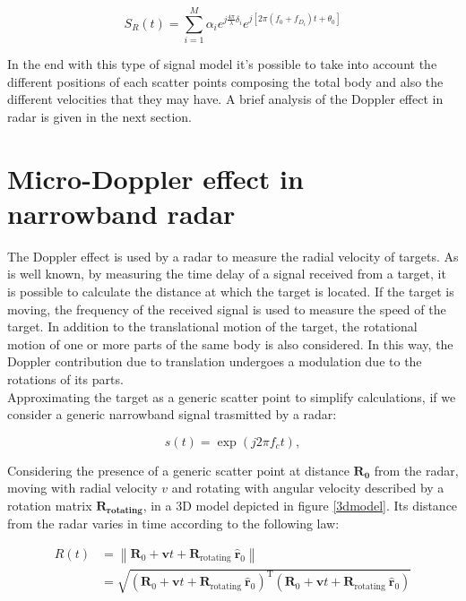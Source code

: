 \begin{equation}
S_{R}(t)=\sum_{i=1}^{M} \alpha_{i} e^{j \frac{4 \pi}{\lambda} \delta_{i}} e^{j\left[2 \pi\left(f_{0}+f_{D_{i}}\right) t+\theta_{0}\right]}
\end{equation}

In the end with this type of signal model it's possible to take into account the different positions of each scatter points composing the total body and also the different velocities that they may have. A brief analysis of the Doppler effect in radar is given in the next section.


\section{Micro-Doppler effect in narrowband radar}
The Doppler effect is used by a radar to measure the radial velocity of targets. As is well known, by measuring the time delay of a signal received from a target, it is possible to calculate the distance at which the target is located. If the target is moving, the frequency of the received signal is used to measure the speed of the target. In addition to the translational motion of the target, the rotational motion of one or more parts of the same body is also considered. In this way, the Doppler contribution due to translation undergoes a modulation due to the rotations of its parts. \\
Approximating the target as a generic scatter point to simplify calculations, if we consider a generic narrowband signal trasmitted by a radar:

\begin{equation}
s(t)=\exp \left(j 2 \pi f_{c} t\right),
\end{equation}

Considering the presence of a generic scatter point at distance $\mathbf{R_{\text {0}}}$ from the radar, moving with radial velocity $v$ and rotating with angular velocity described by a rotation matrix $\mathbf{R_{\text{rotating}}}$, in a 3D model depicted in figure \ref{3dmodel}. Its distance from the radar varies in time according to the following law:

\begin{equation}
\begin{aligned}
R(t) &=\left\|\mathbf{R}_{0}+\mathbf{v} t+\mathbf{R}_{\text {rotating }} \hat{\boldsymbol{r}}_{0}\right\| \\
&=\sqrt{\left(\mathbf{R}_{0}+\mathbf{v} t+\mathbf{R}_{\text {rotating }} \widehat{\boldsymbol{r}}_{0}\right)^{\mathrm{T}}\left(\mathbf{R}_{0}+\mathbf{v} t+\mathbf{R}_{\text {rotating }} \widehat{\boldsymbol{r}}_{0}\right)}
\end{aligned}
\end{equation}

